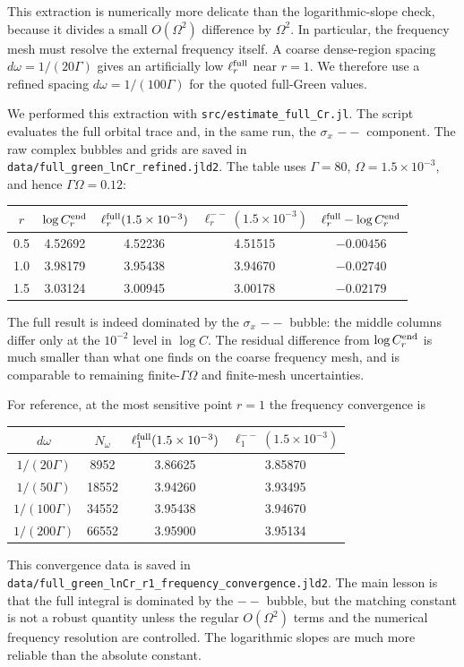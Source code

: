 \documentclass[aps,prx,preprint,amsmath,amssymb]{revtex4-2}
\begin{document}
This extraction is numerically more delicate than the logarithmic-slope check,
because it divides a small \(O(\Omega^2)\) difference by \(\Omega^2\).  In
particular, the frequency mesh must resolve the external frequency itself.  A
coarse dense-region spacing \(d\omega=1/(20\Gamma)\) gives an artificially low
\(\ell_r^{\rm full}\) near \(r=1\).  We therefore use a refined spacing
\(d\omega=1/(100\Gamma)\) for the quoted full-Green values.

We performed this extraction with \texttt{src/estimate\_full\_Cr.jl}.  The
script evaluates the full orbital trace and, in the same run, the \(\sigma_x\)
\(--\) component.  The raw complex bubbles and grids are saved in
\texttt{data/full\_green\_lnCr\_refined.jld2}.  The table uses
\(\Gamma=80\), \(\Omega=1.5\times10^{-3}\), and hence
\(\Gamma\Omega=0.12\):
\begin{center}
\begin{tabular}{ccccc}
\toprule
\(r\) &
\(\log C_r^{\rm end}\) &
\(\ell_r^{\rm full}(1.5\times10^{-3})\) &
\(\ell_r^{--}(1.5\times10^{-3})\) &
\(\ell_r^{\rm full}-\log C_r^{\rm end}\) \\
\midrule
0.5 & 4.52692 & 4.52236 & 4.51515 & \(-0.00456\) \\
1.0 & 3.98179 & 3.95438 & 3.94670 & \(-0.02740\) \\
1.5 & 3.03124 & 3.00945 & 3.00178 & \(-0.02179\) \\
\bottomrule
\end{tabular}
\end{center}
The full result is indeed dominated by the \(\sigma_x\) \({--}\) bubble: the
middle columns differ only at the \(10^{-2}\) level in \(\log C\).  The
residual difference from \(\log C_r^{\rm end}\) is much smaller than what one
finds on the coarse frequency mesh, and is comparable to remaining
finite-\(\Gamma\Omega\) and finite-mesh uncertainties.

For reference, at the most sensitive point \(r=1\) the frequency convergence is
\begin{center}
\begin{tabular}{cccc}
\toprule
\(d\omega\) & \(N_\omega\) &
\(\ell_{1}^{\rm full}(1.5\times10^{-3})\) &
\(\ell_{1}^{--}(1.5\times10^{-3})\) \\
\midrule
\(1/(20\Gamma)\)  & 8952  & 3.86625 & 3.85870 \\
\(1/(50\Gamma)\)  & 18552 & 3.94260 & 3.93495 \\
\(1/(100\Gamma)\) & 34552 & 3.95438 & 3.94670 \\
\(1/(200\Gamma)\) & 66552 & 3.95900 & 3.95134 \\
\bottomrule
\end{tabular}
\end{center}
This convergence data is saved in
\texttt{data/full\_green\_lnCr\_r1\_frequency\_convergence.jld2}.  The main
lesson is that the full integral is dominated by the \({--}\) bubble, but the
matching constant is not a robust quantity unless the regular \(O(\Omega^2)\)
terms and the numerical frequency resolution are controlled.  The logarithmic
slopes are much more reliable than the absolute constant.
\end{document}
